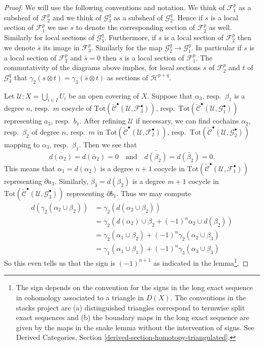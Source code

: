 \begin{proof}
We will use the following conventions and notation. We think of
${\mathcal F}_1^p$ as a subsheaf of ${\mathcal F}_2^p$ and we think of
${\mathcal G}_3^q$ as a subsheaf of ${\mathcal G}_2^q$. Hence if $s$ is
a local section of ${\mathcal F}_1^p$ we use $s$ to denote
the corresponding section of ${\mathcal F}_2^p$ as well. Similarly
for local sections of ${\mathcal G}_3^q$. Furthermore,
if $s$ is a local section of ${\mathcal F}_2^p$ then we denote
$\bar s$ its image in ${\mathcal F}_3^p$. Similarly for the
map ${\mathcal G}_2^q \to {\mathcal G}^q_1$. In particular if
$s$ is a local section of ${\mathcal F}_2^p$ and $\bar s = 0$
then $s$ is a local section of ${\mathcal F}_1^p$. The commutativity
of the diagrams above implies, for local sections $s$ of
${\mathcal F}_2^p$ and $t$ of ${\mathcal G}_3^q$ that
$\gamma_2(s \otimes t) = \gamma_3(\bar s \otimes t)$ as sections of
${\mathcal H}^{p + q}$.

\medskip\noindent
Let ${\mathcal U} : X =  \bigcup_{i \in I} U_i$
be an open covering of $X$. Suppose that $\alpha_3$,
resp.\ $\beta_1$ is a degree $n$, resp.\ $m$ cocycle of
$\text{Tot}(
\check{\mathcal{C}}^\bullet({\mathcal U}, {\mathcal F}_3^\bullet))$,
resp.\ $\text{Tot}(
\check{\mathcal{C}}^\bullet({\mathcal U}, {\mathcal G}_1^\bullet))$
representing $a_3$, resp.\ $b_1$. After refining $\mathcal{U}$ if necessary,
we can find cochains $\alpha_2$, resp.\ $\beta_2$ of
degree $n$, resp.\ $m$ in
$\text{Tot}(
\check{\mathcal{C}}^\bullet({\mathcal U}, {\mathcal F}_2^\bullet))$,
resp.\ $\text{Tot}(
\check{\mathcal{C}}^\bullet({\mathcal U}, {\mathcal G}_2^\bullet))$
mapping to $\alpha_3$, resp.\ $\beta_1$.
Then we see that
$$
\overline{d(\alpha_2)} = d(\bar \alpha_2) = 0
\quad\text{and}\quad
\overline{d(\beta_2)} = d(\bar \beta_2) = 0.
$$
This means that $\alpha_1 = d(\alpha_2)$ is a degree $n + 1$ cocycle in
$\text{Tot}(\check{\mathcal{C}}^\bullet({\mathcal U}, {\mathcal F}_1^\bullet))$
representing $\partial a_3$. Similarly, $\beta_3 = d(\beta_2)$ is
a degree $m + 1$ cocycle in
$\text{Tot}(\check{\mathcal{C}}^\bullet({\mathcal U}, {\mathcal G}_3^\bullet))$
representing $\partial b_1$.
Thus we may compute
\begin{align*}
d(\gamma_2(\alpha_2 \cup \beta_2))
& =
\gamma_2(d(\alpha_2 \cup \beta_2))
\\
& =
\gamma_2(d(\alpha_2) \cup \beta_2 + (-1)^n \alpha_2 \cup d(\beta_2) )
\\
& =
\gamma_2( \alpha_1 \cup \beta_2)  + (-1)^n \gamma_2( \alpha_2 \cup \beta_3)
\\
& =
\gamma_1(\alpha_1 \cup \beta_1) + (-1)^n \gamma_3(\alpha_3 \cup \beta_3)
\end{align*}
So this even tells us that the sign is $(-1)^{n + 1}$ as indicated
in the lemma\footnote{The sign depends on the convention for the
signs in the long exact sequence in cohomology associated to a triangle
in $D(X)$. The conventions in the stacks project are (a) distinguished
triangles correspond to termwise split exact sequences and (b) the boundary
maps in the long exact sequence are given by the maps in the snake lemma
without the intervention of signs. See
Derived Categories, Section \ref{derived-section-homotopy-triangulated}.}.
\end{proof}

